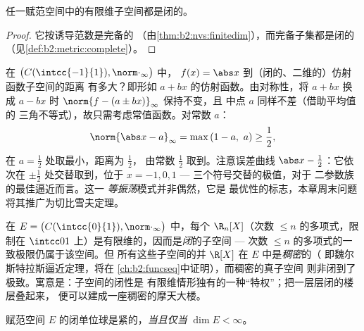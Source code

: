 \begin{corollary}\label{cor:b2:nvs:closedsubspace}
任一赋范空间中的有限维子空间都是闭的。
\end{corollary}

\begin{proof}
它按诱导范数是完备的
（由\cref{thm:b2:nvs:finitedim}），而完备子集都是闭的
（见\cref{def:b2:metric:complete}）。
\end{proof}

\begin{example}[借助对称性计算最佳逼近]\label{ex:b2:nvs:bestaffine}
在 $\bigl(C(\intcc{-1}{1}), \norm\cdot_\infty\bigr)$ 中，
$f(x) = \abs x$ 到（闭的、二维的）仿射函数子空间的距离
有多大？即形如 $a + bx$ 的仿射函数。由对称性，将 $a + bx$ 换成
$a - bx$ 时 $\norm{f - (a \pm bx)}_\infty$ 保持不变，且
中点 $a$ 同样不差（借助平均值的
三角不等式），故只需考虑常值函数。对常数
$a$：
\[
\norm{\abs x - a}_\infty = \max\,(1 - a,\ a)
\geq \frac12 ,
\]
在 $a = \frac12$ 处取最小，距离为 $\frac12$，
由常数 $\frac12$ 取到。注意误差曲线 $\abs x -
\frac12$：它依次在 $\pm\frac12$ 处交替取到，位于 $x = -1, 0,
1$ --- 三个符号交替的极值，对于
二参数族的最佳逼近而言。这一
\emph{等振荡}模式并非偶然，它是
最优性的标志，本章周末问题
将其推广为切比雪夫定理。
\end{example}

\begin{example}[闭子空间与稠密子空间]\label{ex:b2:nvs:closeddense}
在 $E = \bigl(C(\intcc{0}{1}), \norm\cdot_\infty\bigr)$ 中，每个
$\R_n[X]$（次数 $\leq n$ 的多项式，限制在
$\intcc01$ 上）是有限维的，因而是\emph{闭}的子空间
--- 次数 $\leq n$ 的多项式的一致极限仍属于该空间。但
所有这些子空间的并 $\R[X]$ 在 $E$ 中是\emph{稠密}的（
即魏尔斯特拉斯逼近定理，将在
\cref{ch:b2:funcseq}中证明），而稠密的真子空间
则非闭到了极致。寓意是：子空间的闭性是
有限维情形独有的一种“特权”；把一层层闭的楼层叠起来，
便可以建成一座稠密的摩天大楼。
\end{example}

\begin{theorem}[里斯]\label{thm:b2:nvs:riesz}
赋范空间 $E$ 的闭单位球是紧的，\emph{当且仅当
}$\dim E < \infty$。
\end{theorem}

